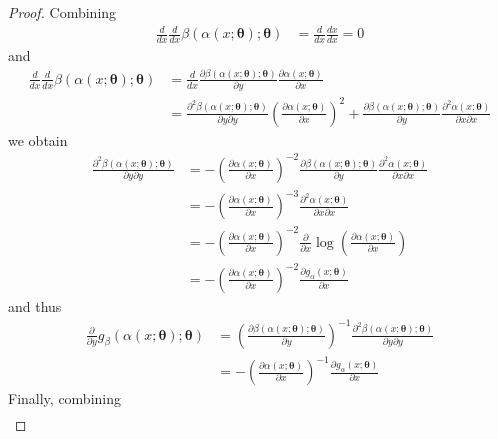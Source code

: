 \begin{proof}
    Combining
    \begin{align}
        \frac{d }{d x} \frac{d }{d x} \beta(\alpha(x; \bm \theta); \bm \theta) &= \frac{d }{d x} \frac{d x}{d x} = 0
    \end{align}
    and 
    \begin{align}
        \frac{d }{d x} \frac{d }{d x} \beta(\alpha(x; \bm \theta); \bm \theta) &= \frac{d}{dx} \frac{\partial \beta(\alpha(x; \bm \theta); \bm \theta)}{\partial y} \frac{\partial \alpha(x; \bm \theta)}{\partial x} \\
        &= \frac{\partial^{2} \beta(\alpha(x; \bm \theta); \bm \theta)}{\partial y\partial y} \left(\frac{\partial \alpha(x; \bm \theta)}{\partial x} \right)^{2} + \frac{\partial \beta(\alpha(x; \bm \theta); \bm \theta)}{\partial y} \frac{\partial^{2} \alpha(x; \bm \theta)}{\partial x \partial x} 
    \end{align}
    we obtain
    \begin{align}
    \frac{\partial^{2} \beta(\alpha(x; \bm \theta); \bm \theta)}{\partial y \partial y}
          &= - \left(\frac{\partial \alpha(x; \bm \theta)}{\partial x} \right)^{-2} \frac{\partial \beta(\alpha(x; \bm \theta); \bm \theta)}{\partial y} \frac{\partial^{2} \alpha(x; \bm \theta)}{\partial x \partial x} \\
          &= - \left(\frac{\partial \alpha(x; \bm \theta)}{\partial x} \right)^{-3} \frac{\partial^{2} \alpha(x; \bm \theta)}{\partial x \partial x}\\
          &= - \left(\frac{\partial \alpha(x; \bm \theta)}{\partial x} \right)^{-2} \frac{\partial}{\partial x} \log \left ( \frac{\partial \alpha(x; \bm \theta)}{\partial x}  \right)\\
          &= - \left(\frac{\partial \alpha(x; \bm \theta)}{\partial x} \right)^{-2} \frac{\partial g_{\alpha}(x; \bm \theta)}{\partial x}
    \end{align}
    and thus
    \begin{align}
        \frac{\partial}{\partial y} g_{\beta}(\alpha(x; \bm \theta); \bm \theta) 
        &= \left(\frac{\partial \beta(\alpha(x; \bm \theta); \bm \theta)}{\partial y} \right)^{-1} \frac{\partial^{2} \beta(\alpha(x; \bm \theta); \bm \theta)}{\partial y \partial y} \\
        &= - \left(\frac{\partial \alpha(x; \bm \theta)}{\partial x} \right)^{-1} \frac{\partial g_{\alpha}(x; \bm \theta)}{\partial x}
    \end{align}
    Finally, combining
    \begin{align}

\end{align}
\end{proof}

